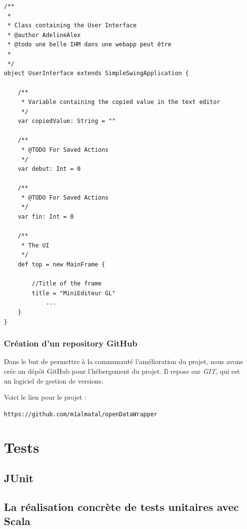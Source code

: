 \documentclass[a4paper,11pt]{article}
\begin{document}
	
\newpage
\begin{lstlisting}[caption=Exemple de scaladoc, label=java]
/**
 *
 * Class containing the User Interface
 * @author AdelineAlex
 * @todo une belle IHM dans une webapp peut être
 *
 */
object UserInterface extends SimpleSwingApplication {

	/**
	 * Variable containing the copied value in the text editor
	 */
	var copiedValue: String = ""
	
	/**
	 * @TODO For Saved Actions
	 */
	var debut: Int = 0

	/**
	 * @TODO For Saved Actions
	 */
	var fin: Int = 0

	/**
	 * The UI
	 */
	def top = new MainFrame {

		//Title of the frame
		title = "MiniEditeur GL"
			...
	}
}

\end{lstlisting}	





\subsubsection{Création d'un repository GitHub}
Dans le but de permettre à la communauté l'amélioration du projet, nous avons crée un dépôt GitHub pour l'hébergement du projet. Il repose sur \textit{GIT}, qui est un logiciel de gestion de versions.

Voici le lien pour le projet :
\begin{center}
\texttt{https://github.com/m1almatal/openDataWrapper}
\end{center}






\section{Tests}

\subsection{JUnit}


\subsection{La réalisation concrète de tests unitaires avec Scala}
\end{document}
